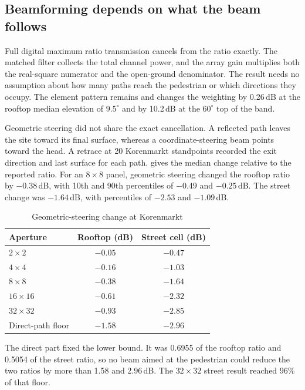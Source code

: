 \documentclass[journal]{IEEEtran}
\begin{document}
\subsection{Beamforming depends on what the beam follows}

Full digital maximum ratio transmission cancels from the ratio exactly. The
matched filter collects the total channel power, and the array gain multiplies
both the real-square numerator and the open-ground denominator. The result needs
no assumption about how many paths reach the pedestrian or which directions
they occupy. The element pattern remains and changes the weighting by 0.26\,dB
at the rooftop median elevation of $9.5^\circ$ and by 10.2\,dB at the
$60^\circ$ top of the band.

Geometric steering did not share the exact cancellation. A reflected path leaves
the site toward its final surface, whereas a coordinate-steering beam points
toward the head. A retrace at 20 Korenmarkt standpoints recorded the exit
direction and last surface for each path.  gives the median
change relative to the reported ratio. For an $8\times8$ panel, geometric
steering changed the rooftop ratio by $-0.38$\,dB, with 10th and 90th percentiles
of $-0.49$ and $-0.25$\,dB. The street change was $-1.64$\,dB, with percentiles
of $-2.53$ and $-1.09$\,dB.

\begin{table}[!t]
  \caption{Geometric-steering change at Korenmarkt}
  \label{tab:steering}
  \centering
  \begin{tabular}{lcc}
    \toprule
    Aperture & Rooftop (dB) & Street cell (dB) \\
    \midrule
    $2\times2$ & $-0.05$ & $-0.47$ \\
    $4\times4$ & $-0.16$ & $-1.03$ \\
    $8\times8$ & $-0.38$ & $-1.64$ \\
    $16\times16$ & $-0.61$ & $-2.32$ \\
    $32\times32$ & $-0.93$ & $-2.85$ \\
    Direct-path floor & $-1.58$ & $-2.96$ \\
    \bottomrule
  \end{tabular}
\end{table}

The direct part fixed the lower bound. It was 0.6955 of the rooftop ratio and
0.5054 of the street ratio, so no beam aimed at the pedestrian could reduce the
two ratios by more than 1.58 and 2.96\,dB. The $32\times32$ street result reached
96\% of that floor.
\end{document}

